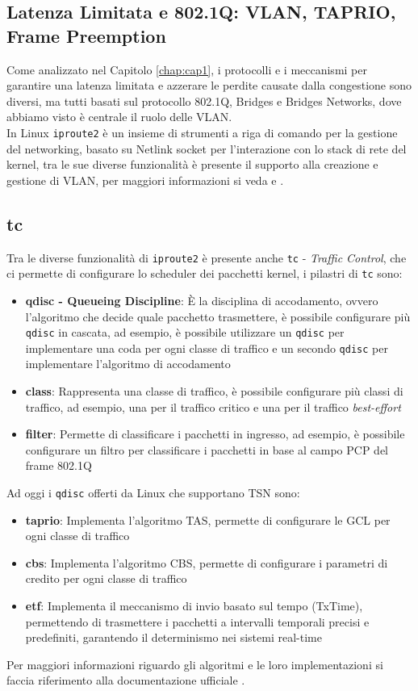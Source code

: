 \documentclass[12pt,a4paper,twoside]{book}
\begin{document}
\begin{onehalfspace}
\section{Latenza Limitata e 802.1Q: VLAN, TAPRIO, Frame Preemption}
Come analizzato nel Capitolo \ref{chap:cap1}, i protocolli e i meccanismi per garantire una latenza limitata e azzerare le perdite causate dalla congestione sono diversi, ma tutti basati sul protocollo 802.1Q, Bridges e Bridges Networks, dove abbiamo visto è centrale il ruolo delle VLAN.
\\
In Linux \texttt{iproute2} è un insieme di strumenti a riga di comando per la gestione del networking, basato su Netlink socket per l'interazione con lo stack di rete del kernel, tra le sue diverse funzionalità è presente il supporto alla creazione e gestione di VLAN, per maggiori informazioni si veda \cite{vlan_linux} e \cite{vlan_linux_setup_iproute2}.
\\
\subsection{tc}
Tra le diverse funzionalità di \texttt{iproute2} è presente anche \texttt{tc} - \textit{Traffic Control}, che ci permette di configurare lo scheduler dei pacchetti kernel, i pilastri di \texttt{tc} sono:
\begin{itemize}
    \item \textbf{qdisc - Queueing Discipline}: È la disciplina di accodamento, ovvero l'algoritmo che decide quale pacchetto trasmettere, è possibile configurare più \texttt{qdisc} in cascata, ad esempio, è possibile utilizzare un \texttt{qdisc} per implementare una coda per ogni classe di traffico e un secondo \texttt{qdisc} per implementare l'algoritmo di accodamento
    \item \textbf{class}: Rappresenta una classe di traffico, è possibile configurare più classi di traffico, ad esempio, una per il traffico critico e una per il traffico \textit{best-effort}
    \item \textbf{filter}: Permette di classificare i pacchetti in ingresso, ad esempio, è possibile configurare un filtro per classificare i pacchetti in base al campo PCP del frame 802.1Q
\end{itemize}
Ad oggi i \texttt{qdisc} offerti da Linux che supportano TSN sono:
\begin{itemize}
    \item \textbf{taprio}: Implementa l'algoritmo TAS, permette di configurare le GCL per ogni classe di traffico
    \item \textbf{cbs}: Implementa l'algoritmo CBS, permette di configurare i parametri di credito per ogni classe di traffico
    \item \textbf{etf}: Implementa il meccanismo di invio basato sul tempo (TxTime), permettendo di trasmettere i pacchetti a intervalli temporali precisi e predefiniti, garantendo il determinismo nei sistemi real-time
\end{itemize}
Per maggiori informazioni riguardo gli algoritmi e le loro implementazioni si faccia riferimento alla documentazione ufficiale \cite{tsn_qdiscs}.
\\

\end{onehalfspace}
\end{document}
